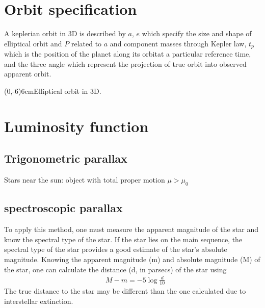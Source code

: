 \section{Orbit specification}

A keplerian orbit in 3D is described by $a$, $e$ which specify the size and shape of elliptical orbit and $P$ related to $a$ and component masses through Kepler law, $t_p$ which is the position of the planet along its orbitat a particular reference time, and the three angle  which represent the projection of true orbit into observed apparent orbit.



{(0,-6)}{6cm}{Elliptical orbit in 3D.}

\section{Luminosity function} 

\subsection{Trigonometric parallax}

Stars near the sun: object with total proper motion $\mu>\mu_0$

\subsection{spectroscopic parallax}

To apply this method, one must measure the apparent magnitude of the star and know the spectral type of the star. If the star lies on the main sequence, the spectral type of the star provides a good estimate of the star's absolute magnitude. Knowing the apparent magnitude (m) and absolute magnitude (M) of the star, one can calculate the distance (d, in parsecs) of the star using
\begin{align*}
&M − m = − 5\log{\frac{d}{10}}    
\end{align*}
The true distance to the star may be different than the one calculated due to interstellar extinction.

